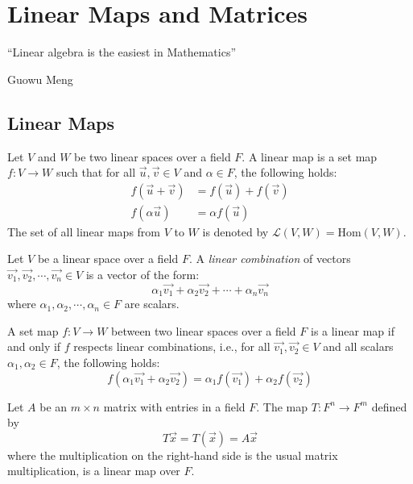 \documentclass[
	11pt, %
	fleqn, %
	a4paper, %
]{LegrandOrangeBook}
\newcommand{\Hom}[2]{\text{Hom}(#1, #2)} %
\begin{document}
\chapter{Linear Maps and Matrices}

\epigraph{``Linear algebra is the easiest in Mathematics''}{Guowu Meng}

\section{Linear Maps}

\begin{definition}
    Let $V$ and $W$ be two linear spaces over a field $F$. A linear map is a set map $f: V \to W$ such that for all $\vec{u}, \vec{v} \in V$ and $\alpha \in F$, the following holds:
    \[
        \begin{split}
            f(\vec{u} + \vec{v}) &= f(\vec{u}) + f(\vec{v}) \\
            f(\alpha \vec{u}) &= \alpha f(\vec{u})
        \end{split}
    \]
    The set of all linear maps from $V$ to $W$ is denoted by $\mathcal{L}(V, W) = \Hom{V}{W}$.
\end{definition}

\begin{definition}
    Let $V$ be a linear space over a field $F$. A \emph{linear combination} of vectors $\vec{v_1}, \vec{v_2}, \cdots, \vec{v_n} \in V$ is a vector of the form:
    \[
        \alpha_1 \vec{v_1} + \alpha_2 \vec{v_2} + \cdots + \alpha_n \vec{v_n}
    \]
    where $\alpha_1, \alpha_2, \cdots, \alpha_n \in F$ are scalars.
\end{definition}

\begin{corollary}
    A set map $f: V \to W$ between two linear spaces over a field $F$ is a linear map if and only if $f$ respects linear combinations, i.e., for all $\vec{v_1}, \vec{v_2} \in V$ and all scalars $\alpha_1, \alpha_2 \in F$, the following holds:
    \[
        f(\alpha_1 \vec{v_1} + \alpha_2 \vec{v_2}) = \alpha_1 f(\vec{v_1}) + \alpha_2 f(\vec{v_2})
    \]
\end{corollary}

\newpage

\begin{example}
    Let $A$ be an $m \times n$ matrix with entries in a field $F$. The map $T: F^n \to F^m$ defined by
    \[
        T\vec{x} = T(\vec{x}) = A \vec{x}
    \]
    where the multiplication on the right-hand side is the usual matrix multiplication, is a linear map over $F$.
\end{example}
\end{document}
